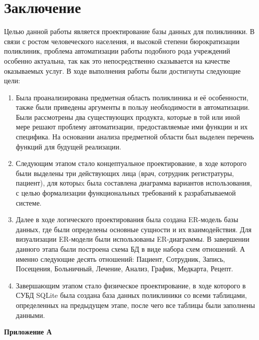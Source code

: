 \documentclass[14pt,a4paper,russian]{extreport}
\begin{document}
\chapter*{Заключение}
Целью данной работы является проектирование базы данных для поликлиники. 
В связи с ростом человеческого населения, и высокой степени бюрократизации поликлиник, проблема
автоматизации работы подобного рода учреждений особенно актуальна, так как это непосредственно
сказывается на качестве оказываемых услуг. В ходе выполнения работы были достигнуты следующие цели: 

\begin{enumerate}[noitemsep]
        \vspace{-5pt}
    \item Была проанализирована предметная область поликлиника и её особенности, также были
        приведены аргументы в пользу необходимости в автоматизации. Были рассмотрены два существующих
        продукта, которые в той или иной мере решают проблему автоматизации, предоставляемые ими
        функции и их специфика. На основании анализа предметной области был выделен перечень
        функций для будущей реализации.
    \item Следующим этапом стало концептуальное проектирование, в ходе которого были выделены
        три действующих лица (врач, сотрудник регистратуры, пациент), для которыx была составлена
        диаграмма вариантов использования, с целью формализации функциональных требований к разрабатываемой системе.
    \item Далее в ходе логического проектирования была создана ER-модель базы данных, где были
        определены основные сущности и их взаимодействия. Для визуализации ER-модели были
        использованы ER-диаграммы. В завершении данного этапа были построена схема БД в виде набора
        схем отношений. А именно следующие десять отношений: Пациент, Сотрудник, Запись, 
		Посещения, Больничный, Лечение, Анализ, График, Медкарта, Рецепт.
    \item Завершающим этапом стало физическое проектирование, в ходе которого в СУБД SQLite была
        создана база данных поликлиники со всеми таблицами, определенных на предыдущем этапе, после
        чего все таблицы были заполнены данными.
\end{enumerate}

{}

\newpage
\hfill\textbf{Приложение А}
\setcounter{figure}{0}
\end{document}
